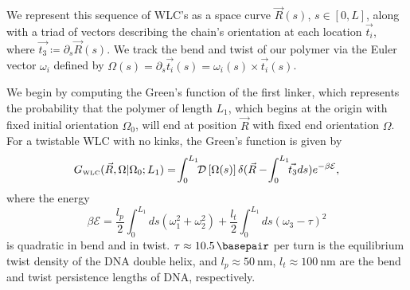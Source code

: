 \documentclass[%
 reprint,
superscriptaddress,
showpacs,preprintnumbers,
 amsmath,amssymb,
 aps,
 prl,
]{revtex4-1}
\newcommand{\gwlc}[2][\Omega_0; L_0]{G_\text{\tiny WLC}(#2|#1)}
\newcommand{\greens}[2][\Omega_0; L]{G(#2|#1)}
\newcommand{\pathd}[1]{\mathcal{D}\left[#1\right]}
\newcommand{\energy}{\mathcal{E}}
\begin{document}
We represent this sequence of WLC's as a space curve $\vec{R}(s)$, $s\in[0,L]$, along
    with a triad of vectors describing the chain's orientation at each location
    $\vec{t_i}$, where $\vec{t_3} \coloneqq \partial_s \vec{R}(s)$.
We track the bend and twist of our polymer via the Euler vector $\omega_i$
    defined by $\Omega(s) = \partial_s \vec{t_i}(s) = \omega_i(s) \times \vec{t_i}(s)$.

We begin by computing the Green's function of the first linker, which represents
the probability that the polymer of length $L_1$, which begins at
the origin with fixed initial orientation $\Omega_0$, will end at position
$\vec{R}$ with fixed end orientation $\Omega$.
For a twistable WLC with no kinks, the Green's function is given by
\begin{equation}\label{eq:path}
    \gwlc[\Omega_0;L_1]{\vec{R}, \Omega} =\! \int_{0}^{L_1} \!\! \pathd{\Omega(s)}
              \delta(\vec{R} - \!\int_{0}^{L_1} \!\!\vec{t_3} ds)
              e^{-\beta \mathcal{E}},
\end{equation}
    where the energy
\begin{equation}\label{eq:energy}
    \beta\energy = \frac{l_p}{2}\int_{0}^{L_1} ds
    (\omega_1^2 + \omega_2 ^2) + \frac{l_t}{2}\int_{0}^{L_1} ds
    {\left(\omega_3 - \tau\right)}^2
\end{equation}
    is quadratic in bend and in twist. {$\tau \approx \SI{10.5}{\basepair}$}
    per turn is the equilibrium twist density of the DNA double helix, and {$l_p
    \approx \SI{50}{\nano\metre}$}, {$l_t \approx \SI{100}{\nano\metre}$} are
    the bend and twist persistence lengths of DNA, respectively.
\end{document}

